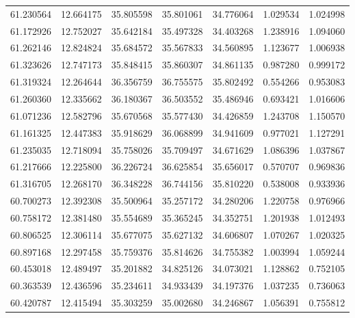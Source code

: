 \begin{tabular}{rrrrrrr}
 61.230564 &  12.664175 &         35.805598 &         35.801061 &         34.776064 &  1.029534 &  1.024998 \\
 61.172926 &  12.752027 &         35.642184 &         35.497328 &         34.403268 &  1.238916 &  1.094060 \\
 61.262146 &  12.824824 &         35.684572 &         35.567833 &         34.560895 &  1.123677 &  1.006938 \\
 61.323626 &  12.747173 &         35.848415 &         35.860307 &         34.861135 &  0.987280 &  0.999172 \\
 61.319324 &  12.264644 &         36.356759 &         36.755575 &         35.802492 &  0.554266 &  0.953083 \\
 61.260360 &  12.335662 &         36.180367 &         36.503552 &         35.486946 &  0.693421 &  1.016606 \\
 61.071236 &  12.582796 &         35.670568 &         35.577430 &         34.426859 &  1.243708 &  1.150570 \\
 61.161325 &  12.447383 &         35.918629 &         36.068899 &         34.941609 &  0.977021 &  1.127291 \\
 61.235035 &  12.718094 &         35.758026 &         35.709497 &         34.671629 &  1.086396 &  1.037867 \\
 61.217666 &  12.225800 &         36.226724 &         36.625854 &         35.656017 &  0.570707 &  0.969836 \\
 61.316705 &  12.268170 &         36.348228 &         36.744156 &         35.810220 &  0.538008 &  0.933936 \\
 60.700273 &  12.392308 &         35.500964 &         35.257172 &         34.280206 &  1.220758 &  0.976966 \\
 60.758172 &  12.381480 &         35.554689 &         35.365245 &         34.352751 &  1.201938 &  1.012493 \\
 60.806525 &  12.306114 &         35.677075 &         35.627132 &         34.606807 &  1.070267 &  1.020325 \\
 60.897168 &  12.297458 &         35.759376 &         35.814626 &         34.755382 &  1.003994 &  1.059244 \\
 60.453018 &  12.489497 &         35.201882 &         34.825126 &         34.073021 &  1.128862 &  0.752105 \\
 60.363539 &  12.436596 &         35.234611 &         34.933439 &         34.197376 &  1.037235 &  0.736063 \\
 60.420787 &  12.415494 &         35.303259 &         35.002680 &         34.246867 &  1.056391 &  0.755812 \\

\end{tabular}
